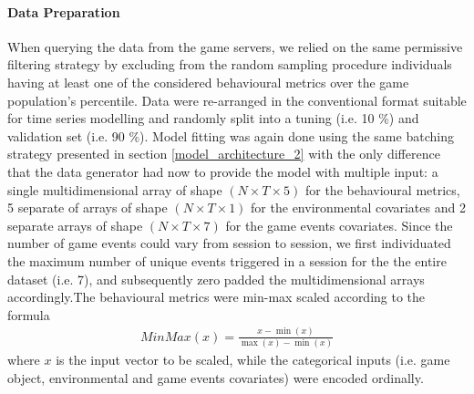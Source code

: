 \paragraph*{Data Preparation} When querying the data from the game servers, we relied on the same permissive filtering strategy by excluding from the random sampling procedure individuals having at least one of the considered behavioural metrics over the game population's  percentile. Data were re-arranged in the conventional format suitable for time series modelling and randomly split into a tuning (i.e. 10 \%) and validation set (i.e. 90 \%). Model fitting was again done using the same batching strategy presented in section \ref{model_architecture_2} with the only difference that the data generator had now to provide the model with multiple input: a single multidimensional array of shape $(N \times T \times 5)$ for the behavioural metrics, 5 separate of arrays of shape $(N \times T \times 1)$ for the environmental covariates and 2 separate arrays of shape $(N \times T \times 7)$ for the game events covariates. Since the number of game events could vary from session to session, we first individuated the maximum number of unique events triggered in a session for the the entire dataset (i.e. 7), and subsequently zero padded the multidimensional arrays accordingly.The behavioural metrics were min-max scaled according to the formula
\begin{equation}
  \begin{gathered} 
  \label{min_max}
        MinMax(x) =\frac{x - \min(x)} {\max(x) - \min(x)} 
  \end{gathered}
\end{equation}
where $x$ is the input vector to be scaled, while the categorical inputs (i.e. game object, environmental and game events covariates) were encoded ordinally.

